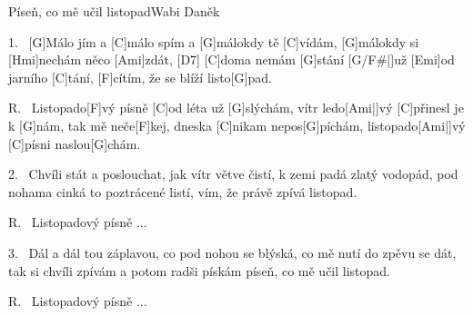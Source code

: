 \begin{song}{Píseň, co mě učil listopad}{Wabi Daněk}

\begin{xverse}{1.~}
[G]Málo jím a [C]málo spím a [G]málokdy tě [C]vídám,
[G]málokdy si [Hmi]nechám něco [Ami]zdát, [D7]{}
[C]doma nemám [G]stání [G/F#|]{už} [Emi]od jarního [C]tání,
[F]cítím, že se blíží listo[G]pad.
\end{xverse}

\begin{xverse}{R.~}
Listopado[F]vý písně [C]od léta už [G]slýchám,
vítr ledo[Ami|]{vý} [C]přinesl je k [G]nám,
tak mě neče[F]kej, dneska [C]nikam nepos[G]píchám,
listopado[Ami|]{vý} [C]písni naslou[G]chám.
\end{xverse}

\begin{xverse}{2.~}
Chvíli stát a poslouchat, jak vítr větve čistí,
k zemi padá zlatý vodopád,
pod nohama cinká to poztrácené listí,
vím, že právě zpívá listopad.
\end{xverse}

\begin{xverse}{R.~}
Listopadový písně ...
\end{xverse}

\begin{xverse}{3.~}
Dál a dál tou záplavou, co pod nohou se blýská,
co mě nutí do zpěvu se dát,
tak si chvíli zpívám a potom radši pískám
píseň, co mě učil listopad.
\end{xverse}

\begin{xverse}{R.~}
Listopadový písně ...
\end{xverse}

\end{song}

